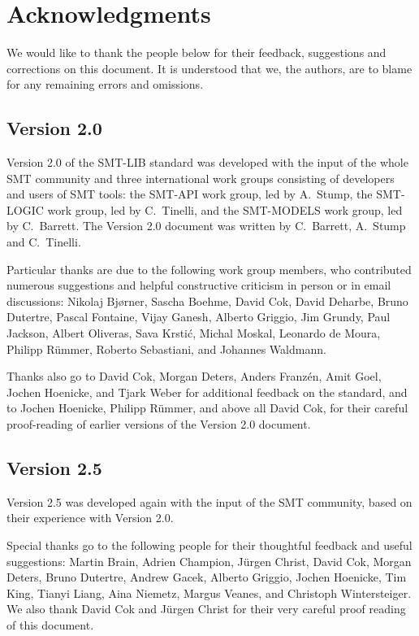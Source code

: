 
\chapter*{Acknowledgments}

\thispagestyle{empty}

We would like to thank the people below for their feedback, suggestions and corrections
on this document.
It is understood that we, the authors, are to blame for any remaining errors
and omissions.


\section*{Version 2.0}

Version 2.0 of the SMT-LIB standard was developed with the input of 
the whole SMT community and
three international work groups consisting of developers and users of SMT tools:
the SMT-API work group, led by A.~Stump,
the SMT-LOGIC work group, led by C.~Tinelli, and
the SMT-MODELS work group, led by C.~Barrett.
The Version 2.0 document was written by C.~Barrett, A.~Stump and C.~Tinelli.

Particular thanks are due to the following work group members, 
who contributed numerous suggestions and helpful constructive criticism 
in person or in email discussions:
Nikolaj Bj{\o}rner, 
Sascha Boehme, 
David Cok, 
David Deharbe, 
Bruno Dutertre,
Pascal Fontaine,
Vijay Ganesh,
Alberto Griggio,
Jim Grundy,
Paul Jackson, 
Albert Oliveras, 
Sava Krsti\'c,
Michal Moskal, 
Leonardo de Moura,
Philipp R\"ummer,
Roberto Sebastiani,
and
Johannes Waldmann.

Thanks also go to
David Cok,
Morgan Deters,
Anders Franz\'en,
Amit Goel,
Jochen Hoenicke,
and
Tjark Weber
for additional feedback on the standard,
and to Jochen Hoenicke, Philipp R\"ummer,
and above all David Cok,
for their careful proof-reading of earlier versions of the Version 2.0 document.

\section*{Version 2.5}

Version 2.5 was developed again with the input of the SMT community, 
based on their experience with Version 2.0.

Special thanks go to the following people
for their thoughtful feedback and useful suggestions:
Martin Brain,
Adrien Champion,
J{\"u}rgen Christ,
David Cok,
Morgan Deters,
Bruno Dutertre,
Andrew Gacek,
Alberto Griggio,
Jochen Hoenicke,
Tim King,
Tianyi Liang,
Aina Niemetz,
Margus Veanes,
and
Christoph Wintersteiger.
We also thank David Cok and J\"{u}rgen Christ for their very careful 
proof reading of this document.



